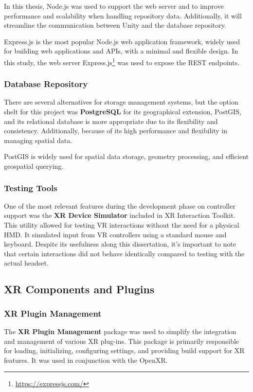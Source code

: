 In this thesis, Node.js was used to support the web server and to improve performance and scalability when handling repository data. 
Additionally, it will streamline the communication between Unity and the database repository.

Express.js is the most popular Node.js web application framework, widely used for building web applications and \gls{API}s, with a minimal and flexible design.
In this study, the web server Express.js\footnote{\url{https://expressjs.com/}} was used to expose the REST endpoints.


\subsubsection{Database Repository}
\label{sec:repos}

There are several alternatives for storage management systems, but the option shelt for this project was \textbf{PostgreSQL} for its geographical extension, PostGIS, and its relational database is more appropriate due to its flexibility and consistency.
Additionally, because of its high performance and flexibility in managing spatial data. 

PostGIS is widely used for spatial data storage, geometry processing, and efficient geospatial querying.

\subsubsection{Testing Tools}

One of the most relevant features during the development phase on controller support was the \textbf{XR Device Simulator} included in XR Interaction Toolkit. 
This utility allowed for testing \gls{VR} interactions without the need for a physical \gls{HMD}. 
It simulated input from \gls{VR} controllers using a standard mouse and keyboard. 
Despite its usefulness along this dissertation, it's important to note that certain interactions did not behave identically compared to testing with the actual headset.


\subsection{XR Components and Plugins}
\subsubsection{XR Plugin Management}
The \textbf{XR Plugin Management} package was used to simplify the integration and management of various XR plug-ins. 
This package is primarily responsible for loading, initializing, configuring settings, and providing build support for XR features. 
It was used in conjunction with the OpenXR.

